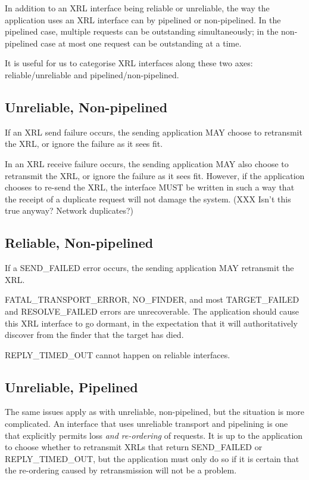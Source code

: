 \documentclass[11pt]{article}
\begin{document}
In addition to an XRL interface being reliable or unreliable, the way
the application uses an XRL interface can by pipelined or
non-pipelined.  In the pipelined case, multiple requests can be
outstanding simultaneously; in the non-pipelined case at most one
request can be outstanding at a time.

It is useful for us to categorise XRL interfaces along these two axes:
reliable/unreliable and pipelined/non-pipelined. 

\subsection*{Unreliable, Non-pipelined}

If an XRL send failure occurs, the sending application MAY choose to
retransmit the XRL, or ignore the failure as it sees fit.  

In an XRL receive failure occurs, the sending application MAY also choose
to retransmit the XRL, or ignore the failure as it sees fit. However, if
the application chooses to re-send the XRL, the interface MUST be written
in such a way that the receipt of a duplicate request will not damage the
system. (XXX Isn't this true anyway? Network duplicates?)

\subsection*{Reliable, Non-pipelined}

If a SEND\_FAILED error occurs, the sending application MAY retransmit the
XRL.

FATAL\_TRANSPORT\_ERROR,  NO\_FINDER, and most TARGET\_FAILED and
RESOLVE\_FAILED errors are unrecoverable.
The application should cause this XRL interface to go dormant, in the
expectation that it will authoritatively discover from the finder that
the target has died.

REPLY\_TIMED\_OUT cannot happen on reliable interfaces.

\subsection*{Unreliable, Pipelined}

The same issues apply as with unreliable, non-pipelined, but the
situation is more complicated.  An interface that uses unreliable
transport and pipelining is one that explicitly permits loss \emph{and
re-ordering} of requests.  It is up to the application to choose
whether to retransmit XRLs that return SEND\_FAILED or REPLY\_TIMED\_OUT, but
the application must only do so if it is certain that the re-ordering
caused by retransmission will not be a problem.
\end{document}
